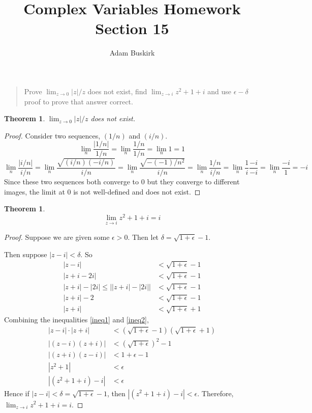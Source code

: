 \documentclass{article}
\title{Complex Variables Homework Section 15}
\author{Adam Buskirk}
\newtheorem{theorem}[section]{Theorem}
\theoremstyle{definition}
\begin{document}
\maketitle

\begin{quote}
Prove $\lim_{z\to 0} |z|/z$ does not exist, find $\lim_{z\to i} z^2+1+i$ 
and use $\epsilon-\delta$ proof to prove that answer correct.
\end{quote}

\begin{theorem}
$\lim_{z \to 0} |z| / z$ does not exist.
\end{theorem}
\begin{proof}
Consider two sequences, $(1/n)$ and $(i/n)$. 
\[ \lim_n \frac{|1/n|}{1/n} = \lim_n \frac{1/n}{1/n} = \lim_n 1 = 1 \]
\[ \lim_n \frac{|i/n|}{i/n} 
=  \lim_n \frac{\sqrt{ (i/n)(-i/n) }}{i/n}
=  \lim_n \frac{\sqrt{ -(-1)/n^2 }}{i/n}
=  \lim_n \frac{1/n}{i/n}
=  \lim_n \frac{1}{i}\frac{-i}{-i}
=  \lim_n \frac{-i}{1} 
=  -i
\]
Since these two sequences both converge to $0$ but they converge to different
images, the limit at $0$ is not well-defined and does not exist.
\end{proof}

\begin{theorem}
\[ \lim_{z\to i} z^2+1+i = i \]
\end{theorem}
\begin{proof}
Suppose we are given some $\epsilon>0$. Then let 
$\delta = \sqrt{1+\epsilon}-1$.

Then suppose $|z-i| < \delta$. So
\begin{align}
|z-i| &< \sqrt{1+\epsilon} - 1 \label{ineq1}\\
|z+i-2i| &< \sqrt{1+\epsilon} - 1 \nonumber \\
|z+i|-|2i| \le \big| |z+i| - |2i| \big| &< \sqrt{1+\epsilon} - 1 \nonumber \\
|z+i|-2 &< \sqrt{1+\epsilon} - 1 \nonumber \\
|z+i| &< \sqrt{1+\epsilon} + 1 \label{ineq2}
\end{align}
Combining the inequalities \eqref{ineq1} and \eqref{ineq2},
\begin{align*}
|z-i| \cdot |z+i| &< (\sqrt{1+\epsilon}-1)(\sqrt{1+\epsilon}+1) \\
|(z-i) (z+i)| &< (\sqrt{1+\epsilon})^2 - 1 \\
|(z+i)(z-i)| &< 1+\epsilon-1 \\
|z^2+1| &< \epsilon \\
|(z^2 + 1 + i) - i| &< \epsilon
\end{align*}
Hence if $|z-i| < \delta = \sqrt{1+\epsilon}-1$, then 
$|(z^2+1+i)-i| < \epsilon$. Therefore, $\lim_{z\to i} z^2+1+i = i$.
\end{proof}
\end{document}
